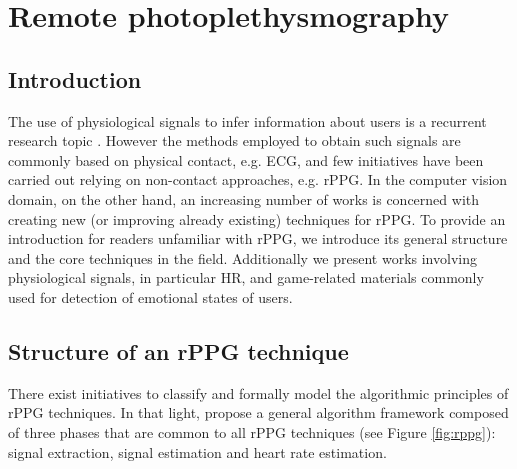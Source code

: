 \chapter{Remote photoplethysmography}


\section{Introduction}

The use of physiological signals to infer information about users is a recurrent research topic \parencite{kivikangas2011review,jerritta2011physiological, kukolja2014comparative}. However the methods employed to obtain such signals are commonly based on physical contact, e.g. ECG, and few initiatives have been carried out relying on non-contact approaches, e.g. rPPG. In the computer vision domain, on the other hand, an increasing number of works is concerned with creating new (or improving already existing) techniques for rPPG. To provide an introduction for readers unfamiliar with rPPG, we introduce its general structure and the core techniques in the field. Additionally we present works involving physiological signals, in particular HR, and game-related materials commonly used for detection of emotional states of users.

\section{Structure of an rPPG technique}

There exist initiatives to classify \parencite{rouast2016remote, mcduff2015survey} and formally model the algorithmic principles \parencite{Wang_2016algorithmic} of rPPG techniques. In that light, \textcite{rouast2016remote} propose a general algorithm framework composed of three phases that are common to all rPPG techniques (see Figure \ref{fig:rppg}): signal extraction, signal estimation and heart rate estimation.

